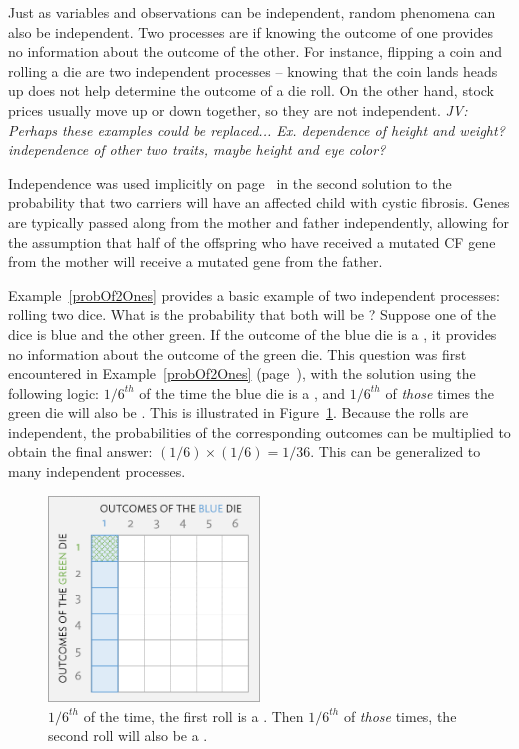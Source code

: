 \begin{doublespace}
Just as variables and observations can be independent, random phenomena can also be independent. Two processes are  if knowing the outcome of one provides no information about the outcome of the other. For instance, flipping a coin and rolling a die are two independent processes -- knowing that the coin lands heads up does not help determine the outcome of a die roll. On the other hand, stock prices usually move up or down together, so they are not independent. \textit{JV: Perhaps these examples could be replaced... Ex. dependence of height and weight? independence of other two traits, maybe height and eye color?}

Independence was used implicitly on page~\pageref{CFInheritanceExample} in the second solution to the probability that two carriers will have an affected child with cystic fibrosis. Genes are typically passed along from the mother and father independently, allowing for the assumption that half of the offspring who have received a mutated CF gene from the mother will receive a mutated gene from the father.

Example~\ref{probOf2Ones} provides a basic example of two independent processes: rolling two dice. What is the probability that both will be ? Suppose one of the dice is blue and the other green. If the outcome of the blue die is a , it provides no information about the outcome of the green die. This question was first encountered in Example~\ref{probOf2Ones} (page~\pageref{probOf2Ones}), with the solution using the following logic: $1/6^{th}$ of the time the blue die is a , and $1/6^{th}$ of \emph{those} times the green die will also be . This is illustrated in Figure~\ref{fig:indepForRollingTwo1s}. Because the rolls are independent, the probabilities of the corresponding outcomes can be multiplied to obtain the final answer: $(1/6)\times(1/6)=1/36$. This can be generalized to many independent processes. 

\begin{figure}[hht]
\centering
\includegraphics[width=0.5\textwidth]{ch_probability_oi_biostat/figures/indepForRollingTwo1s/indepForRollingTwo1s.png}
\caption{$1/6^{th}$ of the time, the first roll is a . Then $1/6^{th}$ of \emph{those} times, the second roll will also be a .}
\label{fig:indepForRollingTwo1s}
\end{figure}


\end{doublespace}
